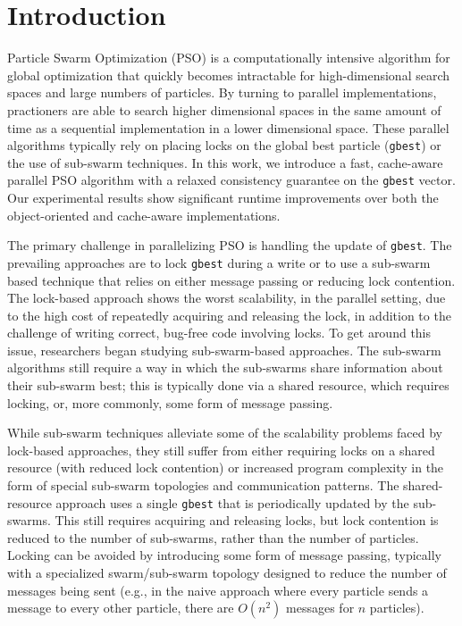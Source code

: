 \section{Introduction}
Particle Swarm Optimization (PSO)\cite{pso} is a computationally intensive algorithm for
global optimization that quickly becomes intractable for
high-dimensional search spaces and large numbers of particles.
By turning to parallel implementations, practioners are able to search higher
dimensional spaces in the same amount of time as a sequential implementation in
a lower dimensional space.
These parallel algorithms typically rely on placing locks on the global best
particle (\texttt{gbest}) or the use of sub-swarm techniques. In this
work, we introduce a fast, cache-aware parallel PSO algorithm with a relaxed
consistency guarantee on the \texttt{gbest} vector. Our experimental results
show significant
runtime improvements over both the object-oriented and cache-aware implementations.

The primary challenge in parallelizing PSO is handling the update of
\texttt{gbest}. The prevailing approaches are to lock \texttt{gbest} during a
write or to use a sub-swarm based technique that relies on either message
passing or reducing lock contention. The lock-based approach shows the
worst scalability, in the parallel setting, due to the high cost of repeatedly
acquiring and releasing the lock, in addition to the challenge of writing
correct, bug-free code involving locks. To get around this issue, researchers began
studying sub-swarm-based approaches. The sub-swarm algorithms still require a
way in which the sub-swarms share information about their sub-swarm best; this
is typically done via a shared resource, which requires locking, or, more
commonly, some form of message passing.

While sub-swarm techniques alleviate some of the scalability problems
faced by
lock-based approaches, they still suffer from either requiring locks on a shared
resource (with reduced lock contention)
or increased program complexity in the form of special sub-swarm topologies
and communication patterns. The shared-resource approach uses a
single \texttt{gbest} that is periodically updated by the sub-swarms.
This still requires acquiring and releasing locks, but lock contention is
reduced to the number of sub-swarms, rather than the number of particles.
Locking can be avoided by introducing some
form of message passing, typically with a specialized swarm/sub-swarm topology
designed to reduce the number of messages being sent (e.g., in the naive
approach where every particle sends a message to every other particle, there are
$O(n^2)$ messages for $n$ particles).

